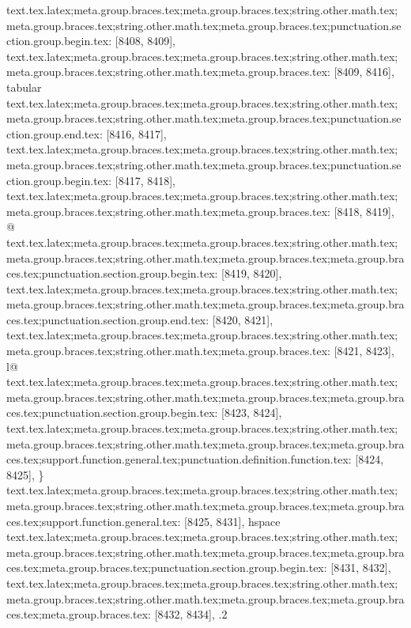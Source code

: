 {{{{{{{{{{{{{{{{{{{{{{{{{{{{{{{{{{{{{{{{{{{{{{{{{{{{{{{{{{{{{{{{{{{{{{{{{{{{{{{{{{{{{{{{{{{{{{{{{{{{{{{{{{{{{{{{{{{{{{{{{{{{{{{{{{{{{{{{{{{{{{{{{{{{{{{{{{{{{{{{{{{{{{{{{{{{{{{{{{{{{{{{{{{{{{{{{{{{{{{{{{{{{{{{{{{{{{{{{{{{{{{{{{{{{{{{{{{{{{{{{{{{{{{text.tex.latex;meta.group.braces.tex;meta.group.braces.tex;string.other.math.tex;meta.group.braces.tex;string.other.math.tex;meta.group.braces.tex;punctuation.section.group.begin.tex: [8408, 8409], {{}
text.tex.latex;meta.group.braces.tex;meta.group.braces.tex;string.other.math.tex;meta.group.braces.tex;string.other.math.tex;meta.group.braces.tex: [8409, 8416], {tabular}
text.tex.latex;meta.group.braces.tex;meta.group.braces.tex;string.other.math.tex;meta.group.braces.tex;string.other.math.tex;meta.group.braces.tex;punctuation.section.group.end.tex: [8416, 8417], {}}
text.tex.latex;meta.group.braces.tex;meta.group.braces.tex;string.other.math.tex;meta.group.braces.tex;string.other.math.tex;meta.group.braces.tex;punctuation.section.group.begin.tex: [8417, 8418], {{}
text.tex.latex;meta.group.braces.tex;meta.group.braces.tex;string.other.math.tex;meta.group.braces.tex;string.other.math.tex;meta.group.braces.tex: [8418, 8419], {@}
text.tex.latex;meta.group.braces.tex;meta.group.braces.tex;string.other.math.tex;meta.group.braces.tex;string.other.math.tex;meta.group.braces.tex;meta.group.braces.tex;punctuation.section.group.begin.tex: [8419, 8420], {{}
text.tex.latex;meta.group.braces.tex;meta.group.braces.tex;string.other.math.tex;meta.group.braces.tex;string.other.math.tex;meta.group.braces.tex;meta.group.braces.tex;punctuation.section.group.end.tex: [8420, 8421], {}}
text.tex.latex;meta.group.braces.tex;meta.group.braces.tex;string.other.math.tex;meta.group.braces.tex;string.other.math.tex;meta.group.braces.tex: [8421, 8423], {l@}
text.tex.latex;meta.group.braces.tex;meta.group.braces.tex;string.other.math.tex;meta.group.braces.tex;string.other.math.tex;meta.group.braces.tex;meta.group.braces.tex;punctuation.section.group.begin.tex: [8423, 8424], {{}
text.tex.latex;meta.group.braces.tex;meta.group.braces.tex;string.other.math.tex;meta.group.braces.tex;string.other.math.tex;meta.group.braces.tex;meta.group.braces.tex;support.function.general.tex;punctuation.definition.function.tex: [8424, 8425], {\}
text.tex.latex;meta.group.braces.tex;meta.group.braces.tex;string.other.math.tex;meta.group.braces.tex;string.other.math.tex;meta.group.braces.tex;meta.group.braces.tex;support.function.general.tex: [8425, 8431], {hspace}
text.tex.latex;meta.group.braces.tex;meta.group.braces.tex;string.other.math.tex;meta.group.braces.tex;string.other.math.tex;meta.group.braces.tex;meta.group.braces.tex;meta.group.braces.tex;punctuation.section.group.begin.tex: [8431, 8432], {{}
text.tex.latex;meta.group.braces.tex;meta.group.braces.tex;string.other.math.tex;meta.group.braces.tex;string.other.math.tex;meta.group.braces.tex;meta.group.braces.tex;meta.group.braces.tex: [8432, 8434], {.2}
}}}}}}}}}}}}}}}}}}}}}}}}}}}}}}}}}}}}}}}}}}}}}}}}}}}}}}}}}}}}}}}}}}}}}}}}}}}}}}}}}}}}}}}}}}}}}}}}}}}}}}}}}}}}}}}}}}}}}}}}}}}}}}}}}}}}}}}}}}}}}}}}}}}}}}}}}}}}}}}}}}}}}}}}}}}}}}}}}}}}}}}}}}}}}}}}}}}}}}}}}}}}}}}}}}}}}}}}}}}}}}}}}}}}}}}}}}}}}}}}}}}}}}}}}}}
